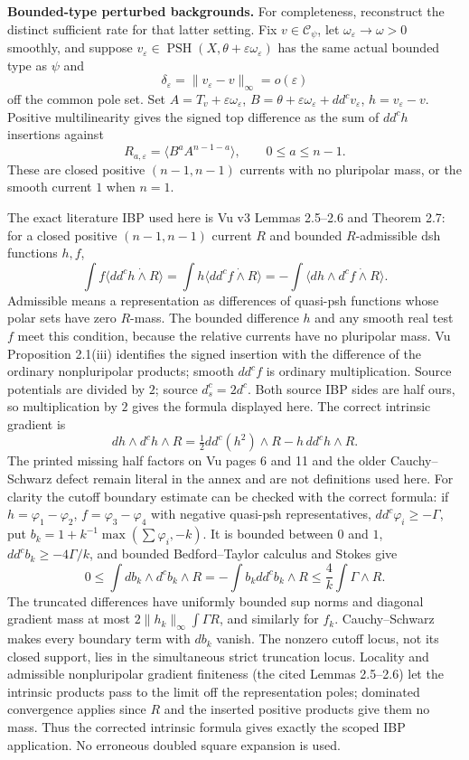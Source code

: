 \documentclass[
  11pt,
]{article}
\begin{document}
\textbf{Bounded-type perturbed backgrounds.} For completeness,
reconstruct the distinct sufficient rate for that latter setting. Fix
\(v\in\mathcal C_\psi\), let \(\omega_\varepsilon\to\omega>0\) smoothly,
and suppose
\(v_\varepsilon\in\operatorname{PSH}(X,\theta+\varepsilon\omega_\varepsilon)\)
has the same actual bounded type as \(\psi\) and \[
\delta_\varepsilon=\|v_\varepsilon-v\|_\infty=o(\varepsilon)
\] off the common pole set. Set \(A=T_v+\varepsilon\omega_\varepsilon\),
\(B=\theta+\varepsilon\omega_\varepsilon+dd^cv_\varepsilon\),
\(h=v_\varepsilon-v\). Positive multilinearity gives the signed top
difference as the sum of \(dd^ch\) insertions against \[
R_{a,\varepsilon}=\langle B^aA^{n-1-a}\rangle,\qquad 0\leq a\leq n-1.
\] These are closed positive \((n-1,n-1)\) currents with no pluripolar
mass, or the smooth current \(1\) when \(n=1\).

The exact literature IBP used here is Vu v3 Lemmas 2.5--2.6 and Theorem
2.7: for a closed positive \((n-1,n-1)\) current \(R\) and bounded
\(R\)-admissible dsh functions \(h,f\), \[
\int f\langle dd^ch\mathbin{\dot\wedge}R\rangle
=\int h\langle dd^cf\mathbin{\dot\wedge}R\rangle
=-\int\langle dh\wedge d^cf\mathbin{\dot\wedge}R\rangle.
\] Admissible means a representation as differences of quasi-psh
functions whose polar sets have zero \(R\)-mass. The bounded difference
\(h\) and any smooth real test \(f\) meet this condition, because the
relative currents have no pluripolar mass. Vu Proposition 2.1(iii)
identifies the signed insertion with the difference of the ordinary
nonpluripolar products; smooth \(dd^cf\) is ordinary multiplication.
Source potentials are divided by \(2\); source \(d^c_s=2d^c\). Both
source IBP sides are half ours, so multiplication by \(2\) gives the
formula displayed here. The correct intrinsic gradient is \[
dh\wedge d^ch\wedge R=\tfrac12dd^c(h^2)\wedge R-h\,dd^ch\wedge R.
\] The printed missing half factors on Vu pages 6 and 11 and the older
Cauchy--Schwarz defect remain literal in the annex and are not
definitions used here. For clarity the cutoff boundary estimate can be
checked with the correct formula: if \(h=\varphi_1-\varphi_2\),
\(f=\varphi_3-\varphi_4\) with negative quasi-psh representatives,
\(dd^c\varphi_i\geq-\Gamma\), put
\(b_k=1+k^{-1}\max(\sum\varphi_i,-k)\). It is bounded between \(0\) and
\(1\), \(dd^cb_k\geq-4\Gamma/k\), and bounded Bedford--Taylor calculus
and Stokes give \[
0\leq\int db_k\wedge d^cb_k\wedge R
=-\int b_kdd^cb_k\wedge R\leq\frac4k\int\Gamma\wedge R.
\] The truncated differences have uniformly bounded sup norms and
diagonal gradient mass at most \(2\|h_k\|_\infty\int\Gamma R\), and
similarly for \(f_k\). Cauchy--Schwarz makes every boundary term with
\(db_k\) vanish. The nonzero cutoff locus, not its closed support, lies
in the simultaneous strict truncation locus. Locality and admissible
nonpluripolar gradient finiteness (the cited Lemmas 2.5--2.6) let the
intrinsic products pass to the limit off the representation poles;
dominated convergence applies since \(R\) and the inserted positive
products give them no mass. Thus the corrected intrinsic formula gives
exactly the scoped IBP application. No erroneous doubled square
expansion is used.
\end{document}

